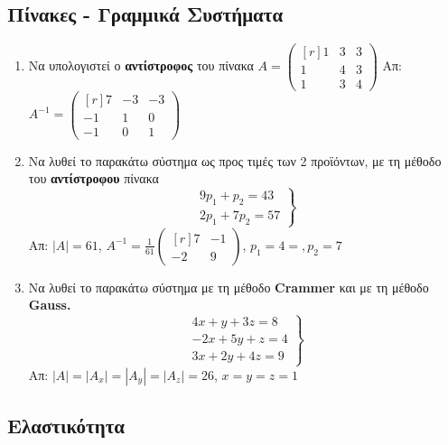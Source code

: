 \documentclass[a4paper,table]{report}
\begin{document}
\subsection*{Πίνακες - Γραμμικά Συστήματα}

\begin{enumerate}
  \item Να υπολογιστεί ο \textbf{αντίστροφος} του πίνακα $A = \begin{pmatrix*}[r]
      1 & 3 & 3 \\
      1 & 4 & 3 \\
      1 & 3 & 4 
    \end{pmatrix*}$ \hfill Απ: $ A^{-1} = 
    \begin{pmatrix*}[r]
      7 & -3 & -3 \\
      -1 & 1 & 0 \\
      -1 & 0 & 1
    \end{pmatrix*}
    $ 

  \item Να λυθεί το παρακάτω σύστημα ως προς τιμές των 2 προϊόντων, με τη μέθοδο του 
    \textbf{αντίστροφου} πίνακα
    \[
      \left.
        \begin{matrix}
          9 p_1+p_2=43 \\
          2 p_1+7p_2=57
        \end{matrix} 
      \right\}
    \]
    \hfill Απ: $ |A|=61$, $ A^{-1} = \frac{1}{61} 
    \begin{pmatrix*}[r]
      7 & -1 \\
      -2 & 9
    \end{pmatrix*}
    $, $ p_1=4=, p_2=7 $

  \item Να λυθεί το παρακάτω σύστημα με τη μέθοδο \textbf{Crammer} και 
    με τη μέθοδο \textbf{Gauss.}
    \[
      \left.
        \begin{matrix}
          4x+y+3z=8 \\
          -2x+5y+z=4 \\
          3x+2y+4z=9
        \end{matrix} 
      \right\}
    \]
    \hfill Απ: $ |A|=|A_x|=|A_y|=|A_z|=26 $, $ x=y=z=1 $
\end{enumerate}

\subsection*{Ελαστικότητα}
\end{document}
